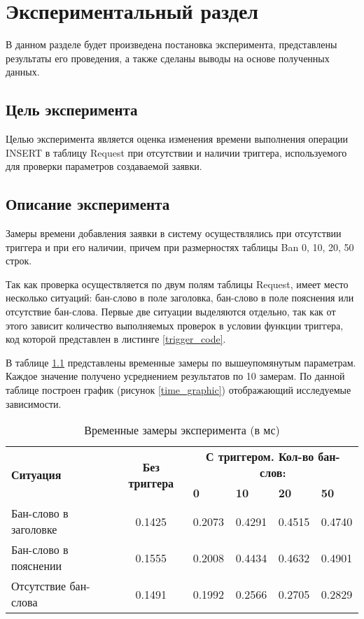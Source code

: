 \chapter{Экспериментальный раздел}

В данном разделе будет произведена постановка эксперимента, представлены результаты его проведения, а также сделаны выводы на основе полученных данных.

\section{Цель эксперимента}

Целью эксперимента является оценка изменения времени выполнения операции INSERT в таблицу Request при отсутствии и наличии триггера, используемого для проверки параметров создаваемой заявки.

\section{Описание эксперимента}

Замеры времени добавления заявки в систему осуществлялись при отсутствии триггера и при его наличии, причем при размерностях таблицы Ban 0, 10, 20, 50 строк.

Так как проверка осуществляется по двум полям таблицы Request, имеет место несколько ситуаций: бан-слово в поле заголовка, бан-слово в поле пояснения или отсутствие бан-слова. Первые две ситуации выделяются отдельно, так как от этого зависит количество выполняемых проверок в условии функции триггера, код которой представлен в листинге \ref{trigger_code}.

В таблице \ref{time_measurements} представлены временные замеры по вышеупомянутым параметрам. Каждое значение получено усреднением результатов по 10 замерам. По данной таблице построен график (рисунок \ref{time_graphic}) отображающий исследуемые зависимости.

\begin{table}[H]
	\centering
	\caption{Временные замеры эксперимента (в мс)}
	\label{time_measurements}
	\begin{tabular}{|p{2.6cm}|c|p{1.6cm}|p{1.6cm}|p{1.6cm}|p{1.6cm}|}
		\hline
		\multirow{2}{*}{\textbf{Ситуация}} & \multirow{2}{*}{\textbf{Без триггера}} & \multicolumn{4}{c|}{\textbf{С триггером. Кол-во бан-слов:}}\\
		\cline{3-6}
		& & \textbf{0} & \textbf{10} & \textbf{20} & \textbf{50}\\
		\hline
		Бан-слово в заголовке & 0.1425 & 0.2073 & 0.4291 & 0.4515 & 0.4740 \\
		\hline
		Бан-слово в пояснении & 0.1555 & 0.2008 & 0.4434 & 0.4632 & 0.4901 \\
		\hline
		Отсутствие бан-слова & 0.1491 & 0.1992 & 0.2566 & 0.2705 & 0.2829 \\
		\hline
	\end{tabular}
\end{table}

